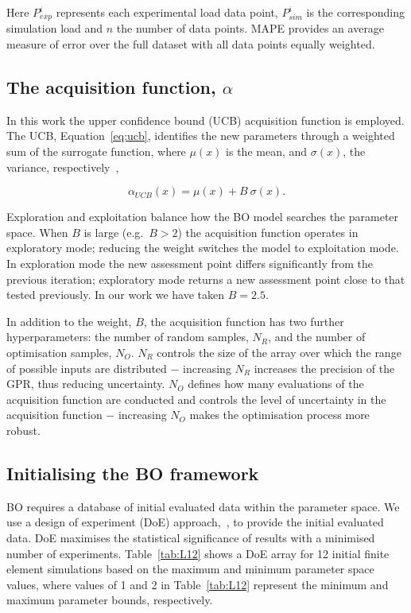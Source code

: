 \documentclass[preprint, review, 12pt]{elsarticle}
\begin{document}
	Here $P^i_{exp}$ represents each experimental load data point, $P_{sim}^i$ is the corresponding simulation load and $n$ the number of data points.
	MAPE provides an average measure of error over the full dataset with all data points equally weighted.

	\subsection{The acquisition function, $\alpha$}
	\label{h:acquisition_function}

	In this work the upper confidence bound (UCB) acquisition function is employed.
	The UCB, Equation~\ref{eq:ucb}, identifies the new parameters through a weighted sum of the surrogate function, where $\mu \left(x \right)$ is the mean, and $\sigma \left(x \right)$, the variance, respectively~\cite{SHAHRIARI2016, DEATH2021},


	\begin{equation}
	\alpha_{UCB} \left( x \right) = \mu \left( x \right) + B\: \sigma\left( x \right).
	\label{eq:ucb}
	\end{equation}

	Exploration and exploitation balance how the BO model searches the parameter space.
	When $B$ is large (e.g.\ $B>2$) the acquisition function operates in exploratory mode; reducing the weight switches the model to exploitation mode.
	In exploration mode the new assessment point differs significantly from the previous iteration; exploratory mode returns a new assessment point close to that tested previously.
	In our work we have taken $B=2.5$.

	In addition to the weight, $B$, the acquisition function has two further hyperparameters: the number of random samples, $N_R$, and the number of optimisation samples, $N_O$.
	$N_R$ controls the size of the array over which the range of possible inputs are distributed $-$ increasing $N_R$ increases the precision of the GPR, thus reducing uncertainty.
	$N_O$ defines how many evaluations of the acquisition function are conducted and controls the level of uncertainty in the acquisition function $-$ increasing $N_O$ makes the optimisation process more robust.

	\subsection{Initialising the BO framework}
	\label{h:framework}

	BO requires a database of initial evaluated data within the parameter space.
	We use a design of experiment (DoE) approach,~\cite{UY2009, FRALEY2020}, to provide the initial evaluated data.
	DoE maximises the statistical significance of results with a minimised number of experiments.
	Table~\ref{tab:L12} shows a DoE array for 12 initial finite element simulations based on the maximum and minimum parameter space values, where values of 1 and 2 in Table~\ref{tab:L12} represent the minimum and maximum parameter bounds, respectively.
\end{document}
